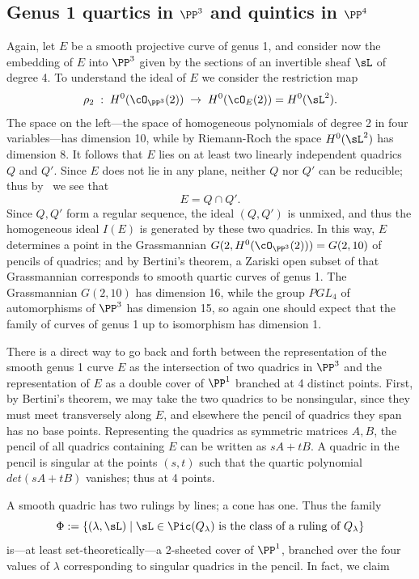 \subsection{Genus 1 quartics in $\PP^3$ and quintics in $\PP^4$} \label{g=1 in P3,P4}

Again, let $E$ be a smooth projective curve of genus 1, and consider now the embedding of $E$ into $\PP^3$ given by the sections of an invertible sheaf $\sL$ of degree 4. To understand the ideal of $E$ we consider the restriction map
$$
\rho_2 \;  : \; H^0(\cO_{\PP^3}(2)) \; \to \; H^0(\cO_{E}(2)) = H^0(\sL^2).
$$
The space on the left---the space of homogeneous polynomials of degree 2 in four variables---has dimension 10, while by Riemann-Roch the space $H^0(\sL^2)$ has dimension 8. It follows that $E$ lies on at least two linearly independent quadrics $Q$ and $Q'$. Since $E$ does not lie in any plane, neither $Q$ nor $Q'$ can be reducible; thus by \bt\ we see that
$$
E = Q \cap Q'.
$$
Since $Q,Q'$ form a regular sequence, the ideal $(Q,Q')$ is unmixed, and thus the homogeneous ideal $I(E)$ is generated by
these two quadrics. In this way, $E$ determines a point in the Grassmannian $G(2, H^0(\cO_{\PP^3}(2))) = G(2, 10)$ of pencils of quadrics; and by Bertini's theorem, a Zariski open subset of that Grassmannian corresponds to smooth quartic curves of genus 1. The Grassmannian $G(2,10)$ has dimension 16, while the group $PGL_4$ of automorphisms of $\PP^3$ has dimension 15, so again one should expect that the family of curves of genus 1 up to isomorphism has dimension 1.

There is a direct way to go back and forth between the representation of the smooth genus 1 curve $E$ as the intersection of two quadrics in $\PP^3$ and the representation of $E$ as a double cover
of $\PP^1$ branched at 4 distinct points. First, by Bertini's theorem, we may take the two quadrics to be nonsingular, since they must meet transversely along $E$, and elsewhere the
pencil of quadrics they span has no base points. Representing the quadrics as symmetric matrices $A,B$, the pencil of all quadrics containing $E$ can be 
written as $sA+tB$. A quadric in the pencil is singular at the points $(s,t)$ such that the quartic polynomial $det(sA+tB)$ vanishes; thus at 4 points.

 A smooth quadric has two rulings by lines; a cone has one. Thus the family
$$
\Phi := \{ (\lambda, \sL) \mid \sL \in \Pic(Q_\lambda) \text{ is the class of a ruling of } Q_\lambda \}
$$
is---at least set-theoretically---a 2-sheeted cover of $\PP^1$, branched over the four values of $\lambda$ corresponding to singular quadrics in the pencil. In fact, we claim

